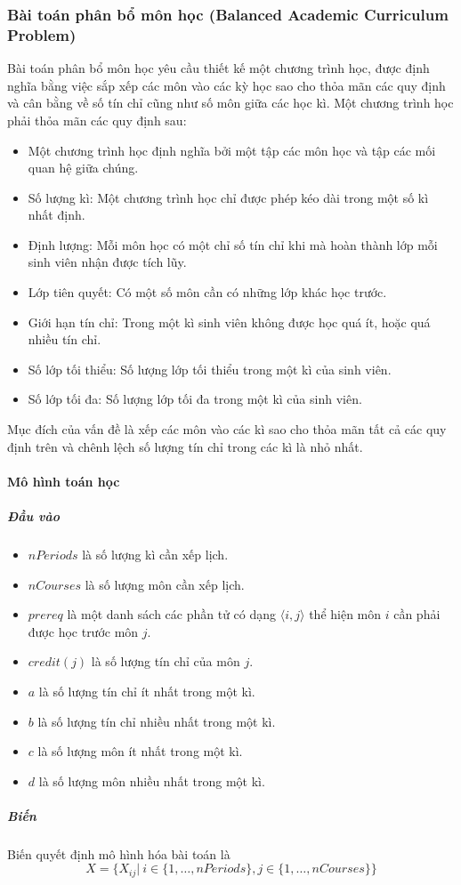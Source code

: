 \documentclass[a4paper,12pt]{report}
\begin{document}
\subsubsection{Bài toán phân bổ môn học (Balanced Academic Curriculum Problem) }
Bài toán phân bổ môn học \cite{csplib30} yêu cầu thiết kế một chương trình học, được định nghĩa bằng việc sắp xếp các môn vào các kỳ học sao cho thỏa mãn các quy định và cân bằng về số tín chỉ cũng như số môn giữa các học kì. Một chương trình học phải thỏa mãn các quy định sau:
\begin{itemize}
\item Một chương trình học định nghĩa bởi một tập các môn học và tập các mối quan hệ giữa chúng.
\item Số lượng kì: Một chương trình học chỉ được phép kéo dài trong một số kì nhất định.
\item Định lượng: Mỗi môn học có một chỉ số tín chỉ khi mà hoàn thành lớp mỗi sinh viên nhận được tích lũy.
\item Lớp tiên quyết: Có một số môn cần có những lớp khác học trước.
\item Giới hạn tín chỉ: Trong một kì sinh viên không được học quá ít, hoặc quá nhiều tín chỉ.
\item Số lớp tối thiểu: Số lượng lớp tối thiểu trong một kì của sinh viên.
\item Số lớp tối đa: Số lượng lớp tối đa trong một kì của sinh viên.
\end{itemize}
Mục đích của vấn đề là xếp các môn vào các kì sao cho thỏa mãn tất cả các quy định trên và  chênh lệch số lượng tín chỉ trong các kì là nhỏ nhất.\paragraph{Mô hình toán học}
\subparagraph{Đầu vào}
\begin{itemize}
	\item $nPeriods$ là số lượng kì cần xếp lịch.
	\item $nCourses$  là số lượng môn cần xếp lịch.
	\item $prereq$ là một danh sách các phần tử có dạng $\langle i,j \rangle $ thể hiện môn $i$ cần phải được học trước môn $j$.
	\item $credit(j)$ là số lượng tín chỉ của môn $j$.
	\item $a$ là số lượng tín chỉ ít nhất trong một kì.
	\item $b$ là số lượng tín chỉ nhiều nhất trong một kì.
	\item $c$ là số lượng môn ít nhất trong một kì.
	\item $d$ là số lượng môn nhiều nhất trong một kì.
\end{itemize}
\subparagraph{Biến}
Biến quyết định mô hình hóa bài toán là $$X= \{ X_{ij}| \ i\in \{1,\dots,nPeriods\},j\in \{1,\dots,nCourses\}  \} $$
\end{document}
